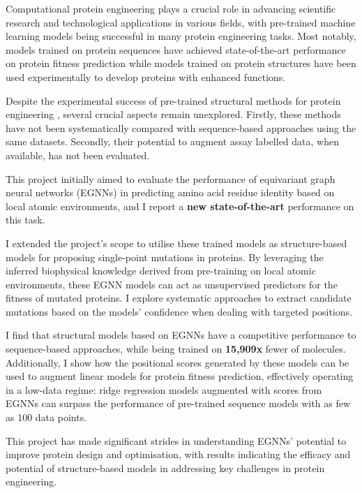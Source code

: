 \documentclass[12pt,a4paper]{report}
\newif\ifsubmission %
\begin{document}
Computational protein engineering plays a crucial role in advancing scientific research and technological applications in various fields, with pre-trained machine learning models being successful in many protein engineering tasks. 
Most notably, models trained on protein sequences have achieved state-of-the-art performance on protein fitness prediction while models trained on protein structures have been used experimentally to develop proteins with enhanced functions. 

Despite the experimental success of pre-trained structural methods for protein engineering \cite{torng20173d, Lu2022}, several crucial aspects remain unexplored. Firstly, these methods have not been systematically compared with sequence-based approaches using the same datasets. Secondly, their potential to augment assay labelled data, when available, has not been evaluated.

This project initially aimed to evaluate the performance of equivariant graph neural networks (EGNNs) in predicting amino acid residue identity based on local atomic environments, and I report a \textbf{new state-of-the-art} performance on this task. 

I extended the project's scope to utilise these trained models as structure-based models for proposing single-point mutations in proteins. By leveraging the inferred biophysical knowledge derived from pre-training on local atomic environments, these EGNN models can act as unsupervised predictors for the fitness of mutated proteins. I explore systematic approaches to extract candidate mutations based on the models' confidence when dealing with targeted positions. 

I find that structural models based on EGNNs have a competitive performance to sequence-based approaches, while being trained on \textbf{15,909x} fewer of molecules. Additionally, I show how the positional scores generated by these models can be used to augment linear models for protein fitness prediction, effectively operating in a low-data regime: ridge regression models augmented with scores from EGNNs can surpass the performance of pre-trained sequence models with as few as 100 data points.

This project has made significant strides in understanding EGNNs' potential to improve protein design and optimisation, with results indicating the efficacy and potential of structure-based models in addressing key challenges in protein engineering.

\ifsubmission\else
\end{document}
